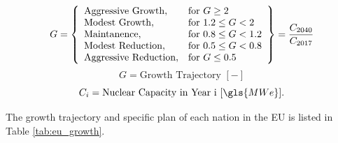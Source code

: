  \[
 G = \left\{\begin{array}{ll}
 \text{Aggressive Growth}, & \text{for } G \geq 2\\
 \text{Modest Growth}, & \text{for } 1.2 \leq G < 2\\
 \text{Maintanence}, & \text{for } 0.8 \leq G < 1.2 \\
 \text{Modest Reduction}, & \text{for } 0.5 \leq G< 0.8\\
 \text{Aggressive Reduction}, & \text{for } G \leq 0.5
 \end{array}\right\} = \frac{C_{2040}}{C_{2017}}\\\\
 \]
 \[
  G = \text{Growth Trajectory  } [-] 
 \]
 \[
 C_{i} = \text{Nuclear Capacity in Year i  } [\gls{MWe}].
 \]

The growth trajectory and specific plan of each nation in the \gls{EU} 
is listed in Table \ref{tab:eu_growth}.  

